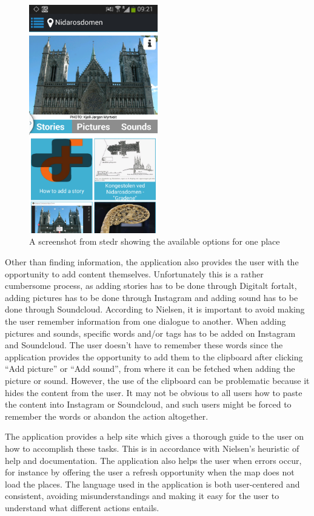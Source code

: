 \begin{figure}[h!]
	\centering
	\includegraphics[width=0.5\textwidth]{fig/stedr_screenshot}
	\caption{A screenshot from stedr showing the available options for one place}
	\label{Fig:stedr_screenshot}
\end{figure}

Other than finding information, the application also provides the user with the opportunity to add content themselves. Unfortunately this is a rather cumbersome process, as adding stories has to be done through Digitalt fortalt, adding pictures has to be done through Instagram and adding sound has to be done through Soundcloud. According to Nielsen, it is important to avoid making the user remember information from one dialogue to another. When adding pictures and sounds, specific words and/or tags has to be added on Instagram and Soundcloud. The user doesn’t have to remember these words since the application provides the opportunity to add them to the clipboard after clicking “Add picture” or “Add sound”, from where it can be fetched when adding the picture or sound. However, the use of the clipboard can be problematic because it hides the content from the user. It may not be obvious to all users how to paste the content into Instagram or Soundcloud, and such users might be forced to remember the words or abandon the action altogether. \newline

The application provides a help site which gives a thorough guide to the user on how to accomplish these tasks. This is in accordance with Nielsen’s heuristic of help and documentation. The application also helps the user when errors occur, for instance by offering the user a refresh opportunity when the map does not load the places. The language used in the application is both user-centered and consistent, avoiding misunderstandings and making it easy for the user to understand what different actions entails. \newline

